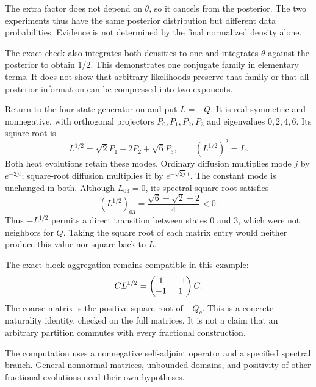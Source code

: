 The extra factor does not depend on $\theta$, so it cancels from the posterior. The two experiments thus have the same posterior distribution but different data probabilities. Evidence is not determined by the final normalized density alone.

The exact check also integrates both densities to one and integrates $\theta$ against the posterior to obtain $1/2$. This demonstrates one conjugate family in elementary terms. It does not show that arbitrary likelihoods preserve that family or that all posterior information can be compressed into two exponents.

Return to the four-state generator on  and put $L=-Q$. It is real symmetric and nonnegative, with orthogonal projectors $P_0,P_1,P_2,P_3$ and eigenvalues $0,2,4,6$. Its square root is
\[
L^{1/2}=\sqrt2P_1+2P_2+\sqrt6P_3,
\qquad (L^{1/2})^2=L.
\]
Both heat evolutions retain these modes. Ordinary diffusion multiplies mode $j$ by $e^{-2jt}$; square-root diffusion multiplies it by $e^{-\sqrt{2j}\,t}$. The constant mode is unchanged in both.
Although $L_{03}=0$, its spectral square root satisfies
\[
(L^{1/2})_{03}=\frac{\sqrt6-\sqrt2-2}{4}<0.
\]
Thus $-L^{1/2}$ permits a direct transition between states $0$ and $3$, which were not neighbors for $Q$. Taking the square root of each matrix entry would neither produce this value nor square back to $L$.

The exact block aggregation remains compatible in this example:
\[
C L^{1/2}=\begin{pmatrix}1&-1\\-1&1\end{pmatrix}C.
\]
The coarse matrix is the positive square root of $-Q_c$. This is a concrete naturality identity, checked on the full matrices. It is not a claim that an arbitrary partition commutes with every fractional construction.

The computation uses a nonnegative self-adjoint operator and a specified spectral branch. General nonnormal matrices, unbounded domains, and positivity of other fractional evolutions need their own hypotheses.

